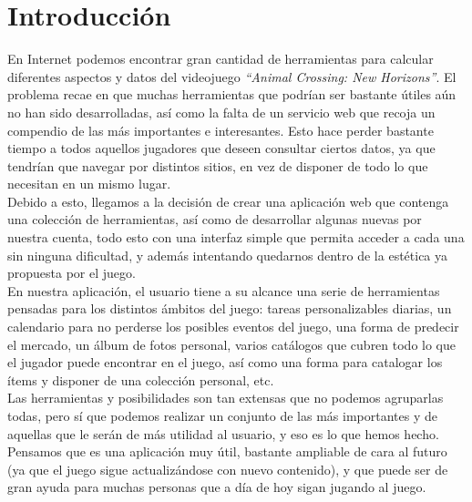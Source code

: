 \chapter{Introducción}\label{introduccion}

En Internet podemos encontrar gran cantidad de herramientas para calcular diferentes aspectos y datos del videojuego \textit{``Animal Crossing: New Horizons”}. El problema recae en que muchas herramientas que podrían ser bastante útiles aún no han sido desarrolladas, así como la falta de un servicio web que recoja un compendio de las más importantes e interesantes. Esto hace perder bastante tiempo a todos aquellos jugadores que deseen consultar ciertos datos, ya que tendrían que navegar por distintos sitios, en vez de disponer de todo lo que necesitan en un mismo lugar.\\

Debido a esto, llegamos a la decisión de crear una aplicación web que contenga una colección de herramientas, así como de desarrollar algunas nuevas por nuestra cuenta, todo esto con una interfaz simple que permita acceder a cada una sin ninguna dificultad, y además intentando quedarnos dentro de la estética ya propuesta por el juego.\\

En nuestra aplicación, el usuario tiene a su alcance una serie de herramientas pensadas para los distintos ámbitos del juego: tareas personalizables diarias, un calendario para no perderse los posibles eventos del juego, una forma de predecir el mercado, un álbum de fotos personal, varios catálogos que cubren todo lo que el jugador puede encontrar en el juego, así como una forma para catalogar los ítems y disponer de una colección personal, etc.\\

Las herramientas y posibilidades son tan extensas que no podemos agruparlas todas, pero sí que podemos realizar un conjunto de las más importantes y de aquellas que le serán de más utilidad al usuario, y eso es lo que hemos hecho. Pensamos que es una aplicación muy útil, bastante ampliable de cara al futuro (ya que el juego sigue actualizándose con nuevo contenido), y que puede ser de gran ayuda para muchas personas que a día de hoy sigan jugando al juego.\\